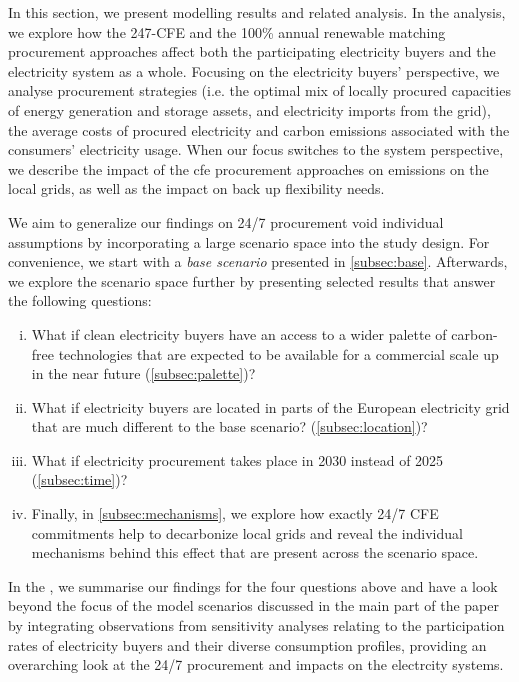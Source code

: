 In this section, we present modelling results and related analysis. 
In the analysis, we explore how the 247-CFE and the 100\% annual renewable matching procurement approaches affect both the participating electricity buyers and the electricity system as a whole. 
Focusing on the electricity buyers' perspective, we analyse procurement strategies (i.e. the optimal mix of locally procured capacities of energy generation and storage assets, and electricity imports from the grid), the average costs of procured electricity and carbon emissions associated with the consumers' electricity usage.
When our focus switches to the system perspective, we describe the impact of the \gls{cfe} procurement approaches on \co emissions on the local grids, as well as the impact on back up flexibility needs.

We aim to generalize our findings on 24/7 procurement void individual assumptions by incorporating a large scenario space into the study design.
For convenience, we start with a \textit{base scenario} presented in \cref{subsec:base}.
Afterwards, we explore the scenario space further by presenting selected results that answer the following questions:
\begin{enumerate}[(i)]
\item What if clean electricity buyers have an access to a wider palette of carbon-free technologies that are expected to be available for a commercial scale up in the near future (\cref{subsec:palette})?
\item What if electricity buyers are located in parts of the European electricity grid that are much different to the base scenario? (\cref{subsec:location})?
\item What if electricity procurement takes place in 2030 instead of 2025 (\cref{subsec:time})? 
\item Finally, in \cref{subsec:mechanisms}, we explore how exactly 24/7 CFE commitments help to decarbonize local grids and reveal the individual mechanisms behind this effect that are present across the scenario space.
\end{enumerate}

In the , we summarise our findings for the four questions above and have a look beyond the focus of the model scenarios discussed in the main part of the paper by integrating observations from sensitivity analyses relating to the participation rates of electricity buyers and their diverse consumption profiles, providing an overarching look at the 24/7 procurement and impacts on the electrcity systems.

